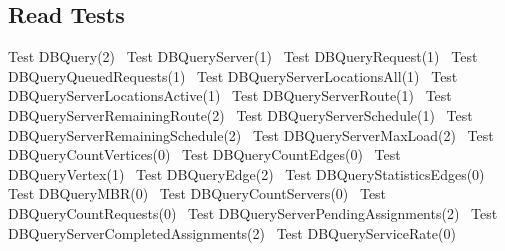 \documentclass{article}
\begin{document}
\subsection{Read Tests}
\label{sec:read-tests}
\nwenddocs{}\endmoddef{}
\LA{}Test \code{}DBQuery\edoc{}(2)~{\nwtagstyle{}}\RA{}
\LA{}Test \code{}DBQueryServer\edoc{}(1)~{\nwtagstyle{}}\RA{}
\LA{}Test \code{}DBQueryRequest\edoc{}(1)~{\nwtagstyle{}}\RA{}
\LA{}Test \code{}DBQueryQueuedRequests\edoc{}(1)~{\nwtagstyle{}}\RA{}
\LA{}Test \code{}DBQueryServerLocationsAll\edoc{}(1)~{\nwtagstyle{}}\RA{}
\LA{}Test \code{}DBQueryServerLocationsActive\edoc{}(1)~{\nwtagstyle{}}\RA{}
\LA{}Test \code{}DBQueryServerRoute\edoc{}(1)~{\nwtagstyle{}}\RA{}
\LA{}Test \code{}DBQueryServerRemainingRoute\edoc{}(2)~{\nwtagstyle{}}\RA{}
\LA{}Test \code{}DBQueryServerSchedule\edoc{}(1)~{\nwtagstyle{}}\RA{}
\LA{}Test \code{}DBQueryServerRemainingSchedule\edoc{}(2)~{\nwtagstyle{}}\RA{}
\LA{}Test \code{}DBQueryServerMaxLoad\edoc{}(2)~{\nwtagstyle{}}\RA{}
\LA{}Test \code{}DBQueryCountVertices\edoc{}(0)~{\nwtagstyle{}}\RA{}
\LA{}Test \code{}DBQueryCountEdges\edoc{}(0)~{\nwtagstyle{}}\RA{}
\LA{}Test \code{}DBQueryVertex\edoc{}(1)~{\nwtagstyle{}}\RA{}
\LA{}Test \code{}DBQueryEdge\edoc{}(2)~{\nwtagstyle{}}\RA{}
\LA{}Test \code{}DBQueryStatisticsEdges\edoc{}(0)~{\nwtagstyle{}}\RA{}
\LA{}Test \code{}DBQueryMBR\edoc{}(0)~{\nwtagstyle{}}\RA{}
\LA{}Test \code{}DBQueryCountServers\edoc{}(0)~{\nwtagstyle{}}\RA{}
\LA{}Test \code{}DBQueryCountRequests\edoc{}(0)~{\nwtagstyle{}}\RA{}
\LA{}Test \code{}DBQueryServerPendingAssignments\edoc{}(2)~{\nwtagstyle{}}\RA{}
\LA{}Test \code{}DBQueryServerCompletedAssignments\edoc{}(2)~{\nwtagstyle{}}\RA{}
\LA{}Test \code{}DBQueryServiceRate\edoc{}(0)~{\nwtagstyle{}}\RA{}
\end{document}
